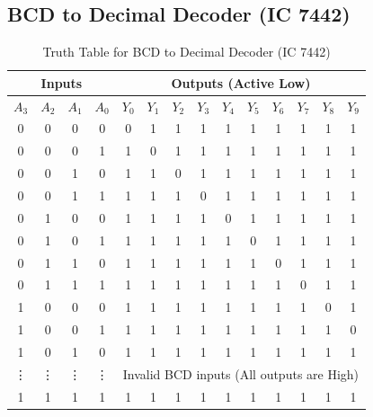 \documentclass[12pt,a4paper]{article}
\begin{document}
\subsection{BCD to Decimal Decoder (IC 7442)}
\begin{table}[H]
\centering
\begin{tabular}{|c|c|c|c|c|c|c|c|c|c|c|c|c|c|}
\hline
\multicolumn{4}{|c|}{\textbf{Inputs}} & \multicolumn{10}{c|}{\textbf{Outputs (Active Low)}} \\
\hline
$A_3$ & $A_2$ & $A_1$ & $A_0$ & $Y_0$ & $Y_1$ & $Y_2$ & $Y_3$ & $Y_4$ & $Y_5$ & $Y_6$ & $Y_7$ & $Y_8$ & $Y_9$ \\
\hline
0 & 0 & 0 & 0 & 0 & 1 & 1 & 1 & 1 & 1 & 1 & 1 & 1 & 1 \\
0 & 0 & 0 & 1 & 1 & 0 & 1 & 1 & 1 & 1 & 1 & 1 & 1 & 1 \\
0 & 0 & 1 & 0 & 1 & 1 & 0 & 1 & 1 & 1 & 1 & 1 & 1 & 1 \\
0 & 0 & 1 & 1 & 1 & 1 & 1 & 0 & 1 & 1 & 1 & 1 & 1 & 1 \\
0 & 1 & 0 & 0 & 1 & 1 & 1 & 1 & 0 & 1 & 1 & 1 & 1 & 1 \\
0 & 1 & 0 & 1 & 1 & 1 & 1 & 1 & 1 & 0 & 1 & 1 & 1 & 1 \\
0 & 1 & 1 & 0 & 1 & 1 & 1 & 1 & 1 & 1 & 0 & 1 & 1 & 1 \\
0 & 1 & 1 & 1 & 1 & 1 & 1 & 1 & 1 & 1 & 1 & 0 & 1 & 1 \\
1 & 0 & 0 & 0 & 1 & 1 & 1 & 1 & 1 & 1 & 1 & 1 & 0 & 1 \\
1 & 0 & 0 & 1 & 1 & 1 & 1 & 1 & 1 & 1 & 1 & 1 & 1 & 0 \\
\hline
1 & 0 & 1 & 0 & 1 & 1 & 1 & 1 & 1 & 1 & 1 & 1 & 1 & 1 \\
\vdots & \vdots & \vdots & \vdots & \multicolumn{10}{c|}{Invalid BCD inputs (All outputs are High)} \\
1 & 1 & 1 & 1 & 1 & 1 & 1 & 1 & 1 & 1 & 1 & 1 & 1 & 1 \\
\hline
\end{tabular}
\caption{Truth Table for BCD to Decimal Decoder (IC 7442)}
\end{table}
\end{document}
